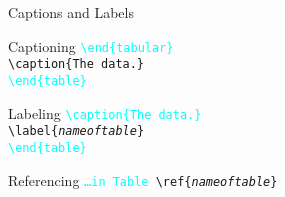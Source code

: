 \begin{frame}{Captions and Labels}
\begin{block}{Captioning}
\hspace{1cm}\texttt{\textcolor{cyan}{\textbackslash end\{tabular\}} \\
\hspace{1cm}\textbackslash caption\{The data.\}\\
\hspace{1cm}\textcolor{cyan}{\textbackslash end\{table\}}}
\end{block}
\begin{block}{Labeling}
\hspace{1cm}\texttt{\textcolor{cyan}{\textbackslash caption\{The data.\}} \\
\hspace{1cm}\textbackslash label\{\emph{nameoftable}\}\\
\hspace{1cm}\textcolor{cyan}{\textbackslash end\{table\}}}
\end{block}
\begin{block}{Referencing}
\hspace{1cm}\texttt{\textcolor{cyan}{\ldots in Table} \textbackslash ref\{\emph{nameoftable}\}}
\end{block}
\end{frame}


